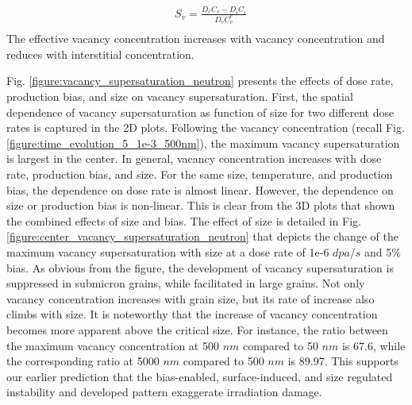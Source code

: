 \documentclass[utf8]{frontiersSCNS} %
\begin{document}
    \begin{equation}
        \begin{aligned}
        &S_v=\frac{D_vC_v-D_iC_i}{D_vC_v^e}\\
        \end{aligned}
    \end{equation}
    The effective vacancy concentration increases with vacancy concentration and reduces with interstitial concentration. 
    
    Fig. \ref{figure:vacancy_supersaturation_neutron} presents the effects of dose rate, production bias, and size on vacancy supersaturation. First, the spatial dependence of vacancy supersaturation as function of size for two different dose rates is captured in the 2D plots. Following the vacancy concentration (recall Fig. \ref{figure:time_evolution_5_1e-3_500nm}), the maximum vacancy supersaturation is largest in the center. In general, vacancy concentration increases with dose rate, production bias, and size. For the same size, temperature, and production bias, the dependence on dose rate is almost linear. However, the dependence on size or production bias is non-linear. This is clear from the 3D plots that shown the combined effects of size and bias. The effect of size is detailed in Fig. \ref{figure:center_vacancy_supersaturation_neutron} that depicts the change of the maximum vacancy supersaturation with size at a dose rate of 1e-6 $dpa/s$ and 5\% bias. As obvious from the figure, the development of vacancy supersaturation is suppressed in submicron grains, while facilitated in large grains. Not only vacancy concentration increases with grain size, but its rate of increase also climbs with size. It is noteworthy that the increase of vacancy concentration becomes more apparent above the critical size. For instance, the ratio between the maximum vacancy concentration at 500 $nm$ compared to 50 $nm$ is 67.6, while the corresponding ratio at 5000 $nm$ compared to 500 $nm$ is 89.97. This supports our earlier prediction that the bias-enabled, surface-induced, and size regulated instability and developed pattern exaggerate irradiation damage.
\end{document}
